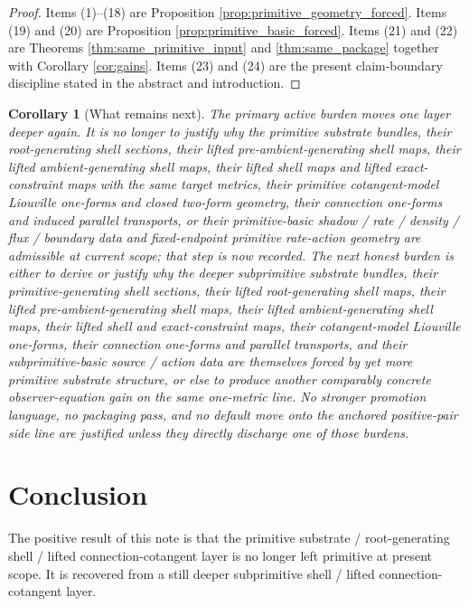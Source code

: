 \documentclass[11pt]{article}
\newtheorem{corollary}{Corollary}
\begin{document}
\begin{proof}
Items (1)--(18) are Proposition \ref{prop:primitive_geometry_forced}. Items (19) and (20) are Proposition \ref{prop:primitive_basic_forced}. Items (21) and (22) are Theorems \ref{thm:same_primitive_input} and \ref{thm:same_package} together with Corollary \ref{cor:gains}. Items (23) and (24) are the present claim-boundary discipline stated in the abstract and introduction.
\end{proof}

\begin{corollary}[What remains next]
\label{cor:what_next}
The primary active burden moves one layer deeper again. It is no longer to justify why the primitive substrate bundles, their root-generating shell sections, their lifted pre-ambient-generating shell maps, their lifted ambient-generating shell maps, their lifted shell maps and lifted exact-constraint maps with the same target metrics, their primitive cotangent-model Liouville one-forms and closed two-form geometry, their connection one-forms and induced parallel transports, or their primitive-basic shadow / rate / density / flux / boundary data and fixed-endpoint primitive rate-action geometry are admissible at current scope; that step is now recorded. The next honest burden is either to derive or justify why the deeper subprimitive substrate bundles, their primitive-generating shell sections, their lifted root-generating shell maps, their lifted pre-ambient-generating shell maps, their lifted ambient-generating shell maps, their lifted shell and exact-constraint maps, their cotangent-model Liouville one-forms, their connection one-forms and parallel transports, and their subprimitive-basic source / action data are themselves forced by yet more primitive substrate structure, or else to produce another comparably concrete observer-equation gain on the same one-metric line. No stronger promotion language, no packaging pass, and no default move onto the anchored positive-pair side line are justified unless they directly discharge one of those burdens.
\end{corollary}

\section{Conclusion}

The positive result of this note is that the primitive substrate / root-generating shell / lifted connection-cotangent layer is no longer left primitive at present scope. It is recovered from a still deeper subprimitive shell / lifted connection-cotangent layer.
\end{document}
